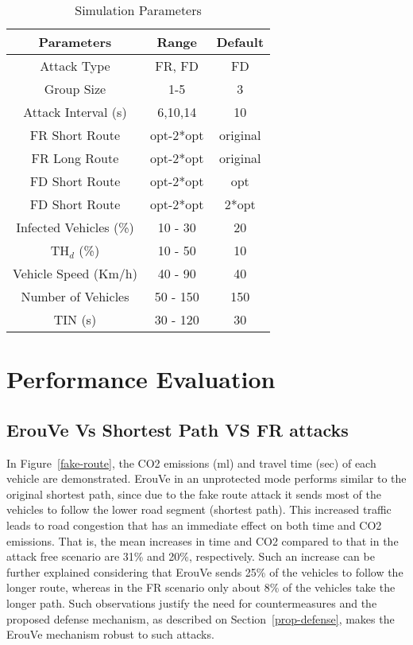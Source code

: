 \documentclass[conference]{IEEEtran}
\begin{document}
\begin{table}[!htb]
\centering
\caption{Simulation Parameters}
\begin{tabular}{|c|c|c|}
\hline
{\bf Parameters}     & {\bf Range} & {\bf Default} \\ \hline
Attack Type          & FR, FD      & FD            \\ \hline
Group Size           & 1-5         & 3             \\ \hline
Attack Interval (s)  & 6,10,14     & 10            \\ \hline
FR Short Route       & opt-2*opt   & original           \\ \hline
FR Long Route        & opt-2*opt   & original           \\ \hline
FD Short Route       & opt-2*opt   & opt           \\ \hline
FD Short Route       & opt-2*opt   & 2*opt         \\ \hline
Infected Vehicles (\%)   & 10 - 30      &   20           \\ \hline
TH$_d$ (\%) & 10 -  50      & 10           \\ \hline
Vehicle Speed (Km/h) &40 - 90       & 40            \\ \hline
Number of Vehicles   & 50 - 150      & 150           \\ \hline
TIN (s)   & 30 - 120      & 30           \\ \hline
\end{tabular}
\label{params}
\end{table}

\section{Performance Evaluation}
\label{perf-eval}

\subsection{ErouVe Vs Shortest Path VS FR attacks}

In Figure~\ref{fake-route}, the CO2 emissions (ml) and travel time (sec) of each vehicle are demonstrated.
ErouVe in an unprotected mode performs similar to the original shortest path, since due to the
fake route attack it sends most of the vehicles to follow the lower road segment (shortest path).
This increased traffic leads to road congestion that has an immediate effect on both time and CO2 emissions. That is, the mean increases in time and CO2 compared to that in the attack free scenario are 31\% and 20\%, respectively.
Such an increase can be further explained considering that ErouVe sends 25\% of the vehicles to follow the longer route, whereas in the FR scenario only about 8\% of the vehicles take the longer path.
Such observations justify the need for countermeasures and the proposed defense mechanism, 
as described on Section~\ref{prop-defense}, makes the ErouVe mechanism robust to such attacks.
\end{document}
